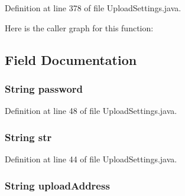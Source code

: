 Definition at line 378 of file Upload\+Settings.\+java.



Here is the caller graph for this function\+:




\subsection{Field Documentation}
\hypertarget{class_microchip_m_p_f_s_1_1_upload_settings_acbd76b816d055b7a642c219fd9751020}{}
\subsubsection[{password}]{\setlength{\rightskip}{0pt plus 5cm}String password}\label{class_microchip_m_p_f_s_1_1_upload_settings_acbd76b816d055b7a642c219fd9751020}


Definition at line 48 of file Upload\+Settings.\+java.

\hypertarget{class_microchip_m_p_f_s_1_1_upload_settings_a27f3fd6bae71e73f3c13bb57945845a6}{}
\subsubsection[{str}]{\setlength{\rightskip}{0pt plus 5cm}String str}\label{class_microchip_m_p_f_s_1_1_upload_settings_a27f3fd6bae71e73f3c13bb57945845a6}


Definition at line 44 of file Upload\+Settings.\+java.

\hypertarget{class_microchip_m_p_f_s_1_1_upload_settings_afdf9f2cc10fbe6b64feb52e7f8a5a9d8}{}
\subsubsection[{upload\+Address}]{\setlength{\rightskip}{0pt plus 5cm}String upload\+Address}\label{class_microchip_m_p_f_s_1_1_upload_settings_afdf9f2cc10fbe6b64feb52e7f8a5a9d8}


